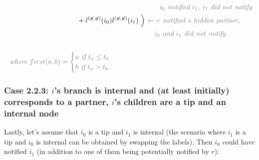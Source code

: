 \documentclass[a4paper,10pt]{article}
\begin{document}
\begin{equation}
\begin{split}
&\textit{\color{gray}~~~~~~~~~~~~~~~~~~~~~~~~~~~~~~~~~~~~~~~~~~~~~~~~~~~~~~~~~~~~~$i_0$ notified $i_1$, $i_1$ did not notify} \\
&~~~~~~~~~~~~~~~~~~~~~~~~~~~~~~+l^{(\not{n},\not{n})}(i_0)l^{(\not{n},\not{n})}(i_1)~\Big) \textit{\color{gray}~$\leftarrow$ $r$ notified a hidden partner,} \\
&\textit{\color{gray}~~~~~~~~~~~~~~~~~~~~~~~~~~~~~~~~~~~~~~~~~~~~~~~~~~~~~~~~~~~$i_0$ and $i_1$ did not notify} \\
\\
&\textit{\color{gray}~where } \color{gray}first(a,b) = 
\begin{cases}
a \textit{~if $t_a \leq t_b$}\\
b \textit{~if $t_a > t_b$.}
\end{cases} 
 \end{split}
\label{eq:lu-tip-tip}
\end{equation}


\subsubsection*{Case 2.2.3: $i$'s branch is internal and (at least initially) corresponds to a partner, $i$'s children are a tip and an internal node}
Lastly, let's assume that $i_0$ is a tip and $i_1$ is internal (the scenario where $i_1$ is a tip and $i_0$ is internal can be obtained by swapping the labels). Then $i_0$ could have notified $i_1$ (in addition to one of them being potentially notified by $r$):
\end{document}
